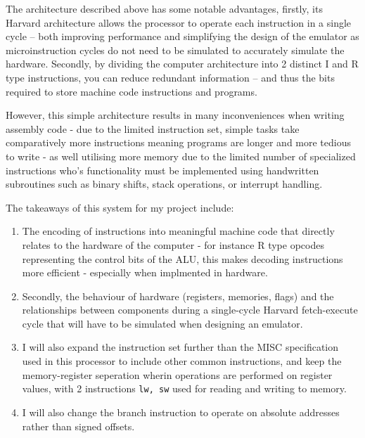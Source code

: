
The architecture described above has some notable advantages, firstly, its Harvard architecture allows the processor to operate each instruction in a single cycle – both improving performance and simplifying the design of the emulator as microinstruction cycles do not need to be simulated  to accurately simulate the hardware. Secondly, by dividing the computer architecture into 2 distinct I and R type instructions, you can reduce redundant information – and thus the bits required to store machine code instructions and programs.

However, this simple architecture results in many inconveniences when writing assembly code - due to the limited instruction set, simple tasks take comparatively more instructions meaning programs are longer and more tedious to write - as well utilising more memory due to the limited number of specialized instructions who's functionality must be implemented using handwritten subroutines such as binary shifts, stack operations, or interrupt handling. 

\bigskip

The takeaways of this system for my project include:
\begin{enumerate}
    \item The encoding of instructions into meaningful machine code that directly relates to the hardware of the computer - for instance R type opcodes representing the control bits of the ALU, this makes decoding instructions more efficient - especially when implmented in hardware.
    \item Secondly, the behaviour of hardware (registers, memories, flags) and the relationships between components during a single-cycle Harvard fetch-execute cycle that will have to be simulated when designing an emulator.
    \item I will also expand the instruction set further than the MISC specification used in this processor to include other common instructions, and keep the memory-register seperation wherin operations are performed on register values, with 2 instructions \texttt{lw, sw} used for reading and writing to memory.
    \item I will also change the branch instruction to operate on absolute addresses rather than signed offsets.
\end{enumerate}

